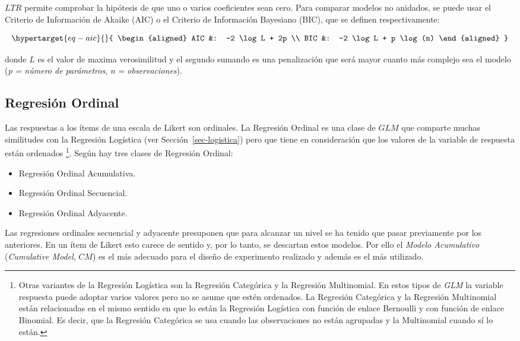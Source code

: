 \documentclass[
  12pt,
  a4paper,
  extrafontsizes,
  onecolumn,
  openright,
  table]{memoir}
\providecommand{\tightlist}{%
  \setlength{\itemsep}{0pt}\setlength{\parskip}{0pt}}\usepackage{longtable,booktabs,array}
\begin{document}
\(LTR\) permite comprobar la hipótesis de que uno o varios coeficientes
sean cero. Para comparar modelos no anidados, se puede usar el Criterio
de Información de Akaike (AIC) o el Criterio de Información Bayesiano
(BIC), que se definen respectivamente:

\begin{equation}\protect\hypertarget{eq-aic}{}{
\begin{aligned}
AIC &: -2 \log L + 2p \\
BIC &: -2 \log L + p \log(n)
\end{aligned}
}\label{eq-aic}\end{equation}

donde \(L\) es el valor de maxima verosimilitud y el segundo sumando es
una penalización que será mayor cuanto más complejo sea el modelo
(\emph{p = número de parámetros}, \emph{n = observaciones}).

\hypertarget{sec-ordinal}{%
\subsection{Regresión Ordinal}\label{sec-ordinal}}

Las respuestas a los ítems de una escala de Likert son ordinales. La
Regresión Ordinal es una clase de \(GLM\) que comparte muchas
similitudes con la Regresión Logística (ver Sección~\ref{sec-logistica})
pero que tiene en consideración que los valores de la variable de
respuesta están ordenados \footnote{Otras variantes de la Regresión
  Logística son la Regresión Categórica y la Regresión Multinomial. En
  estos tipos de \emph{GLM} la variable respuesta puede adoptar varios
  valores pero no se asume que estén ordenados. La Regresión Categórica
  y la Regresión Multinomial están relacionadas en el mismo sentido en
  que lo están la Regresión Logística con función de enlace Bernoulli y
  con función de enlace Binomial. Es decir, que la Regresión Categórica
  se usa cuando las observaciones no están agrupadas y la Multinomial
  cuando sí lo están.}. Según \textcite[pp.~3-11]{burkner2019} hay tres
clases de Regresión Ordinal:

\begin{itemize}
\tightlist
\item
  Regresión Ordinal Acumulativa.
\item
  Regresión Ordinal Secuencial.
\item
  Regresión Ordinal Adyacente.
\end{itemize}

Las regresiones ordinales secuencial y adyacente presuponen que para
alcanzar un nivel se ha tenido que pasar previamente por los anteriores.
En un ítem de Likert esto carece de sentido y, por lo tanto, se
descartan estos modelos. Por ello el \emph{Modelo Acumulativo}
(\emph{Cumulative Model}, \(CM\)) es el más adecuado para el diseño de
experimento realizado \autocite[ver][pp.~23-24]{burkner2019} y además es
el más utilizado.
\end{document}
